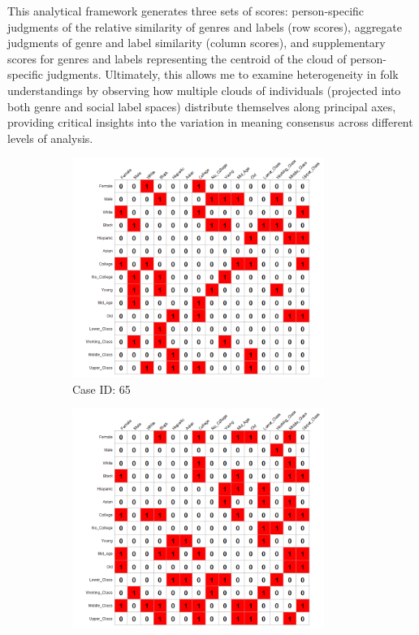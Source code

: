 \documentclass[12pt]{article}
\begin{document}
This analytical framework generates three sets of scores: person-specific judgments of the relative similarity of genres and labels (row scores), aggregate judgments of genre and label similarity (column scores), and supplementary scores for genres and labels representing the centroid of the cloud of person-specific judgments. Ultimately, this allows me to examine heterogeneity in folk understandings by observing how multiple clouds of individuals (projected into both genre and social label spaces) distribute themselves along principal axes, providing critical insights into the variation in meaning consensus across different levels of analysis.

\begin{figure}[ht!]
    \captionsetup[subfigure]{font=footnotesize,labelfont=footnotesize}
    \centering
     \begin{subfigure}[b]{0.49\textwidth}
        \includegraphics[trim={1cm 0cm 0cm 0cm},clip, width=0.9\textwidth]{Plots/data-ex-cbb1.png}
            \caption{Case ID: 65}
            \label{fig:ind-ex-cbb1}
    \end{subfigure}
     \begin{subfigure}[b]{0.49\textwidth}
        \includegraphics[trim={1cm 0cm 0cm 0cm},clip, width=0.9\textwidth]{Plots/data-ex-cbb2.png}

\end{subfigure}
\end{figure}
\end{document}
